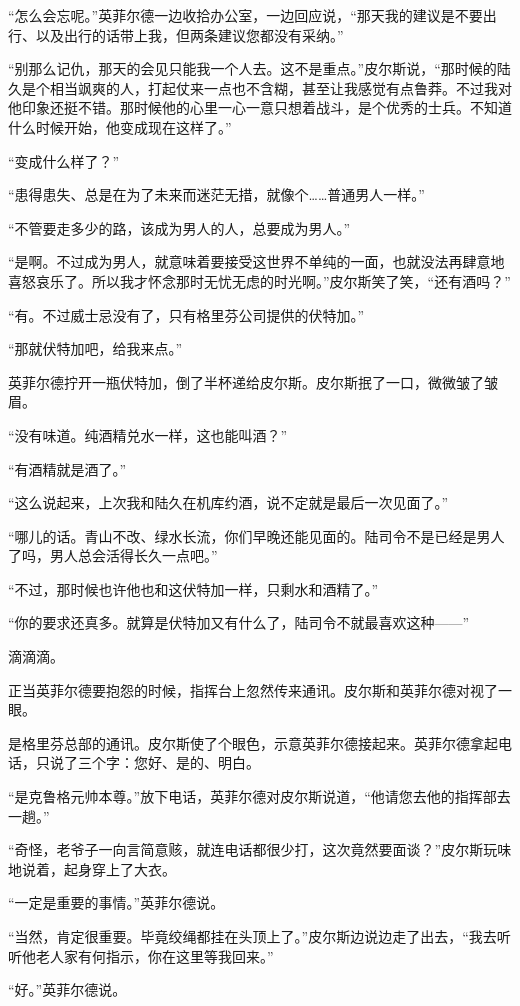 “怎么会忘呢。”英菲尔德一边收拾办公室，一边回应说，“那天我的建议是不要出行、以及出行的话带上我，但两条建议您都没有采纳。”

“别那么记仇，那天的会见只能我一个人去。这不是重点。”皮尔斯说，“那时候的陆久是个相当飒爽的人，打起仗来一点也不含糊，甚至让我感觉有点鲁莽。不过我对他印象还挺不错。那时候他的心里一心一意只想着战斗，是个优秀的士兵。不知道什么时候开始，他变成现在这样了。”

“变成什么样了？”

“患得患失、总是在为了未来而迷茫无措，就像个……普通男人一样。”

“不管要走多少的路，该成为男人的人，总要成为男人。”

“是啊。不过成为男人，就意味着要接受这世界不单纯的一面，也就没法再肆意地喜怒哀乐了。所以我才怀念那时无忧无虑的时光啊。”皮尔斯笑了笑，“还有酒吗？”

“有。不过威士忌没有了，只有格里芬公司提供的伏特加。”

“那就伏特加吧，给我来点。”

英菲尔德拧开一瓶伏特加，倒了半杯递给皮尔斯。皮尔斯抿了一口，微微皱了皱眉。

“没有味道。纯酒精兑水一样，这也能叫酒？”

“有酒精就是酒了。”

“这么说起来，上次我和陆久在机库约酒，说不定就是最后一次见面了。”

“哪儿的话。青山不改、绿水长流，你们早晚还能见面的。陆司令不是已经是男人了吗，男人总会活得长久一点吧。”

“不过，那时候也许他也和这伏特加一样，只剩水和酒精了。”

“你的要求还真多。就算是伏特加又有什么了，陆司令不就最喜欢这种——”

滴滴滴。

正当英菲尔德要抱怨的时候，指挥台上忽然传来通讯。皮尔斯和英菲尔德对视了一眼。

是格里芬总部的通讯。皮尔斯使了个眼色，示意英菲尔德接起来。英菲尔德拿起电话，只说了三个字：您好、是的、明白。

“是克鲁格元帅本尊。”放下电话，英菲尔德对皮尔斯说道，“他请您去他的指挥部去一趟。”

“奇怪，老爷子一向言简意赅，就连电话都很少打，这次竟然要面谈？”皮尔斯玩味地说着，起身穿上了大衣。

“一定是重要的事情。”英菲尔德说。

“当然，肯定很重要。毕竟绞绳都挂在头顶上了。”皮尔斯边说边走了出去，“我去听听他老人家有何指示，你在这里等我回来。”

“好。”英菲尔德说。

